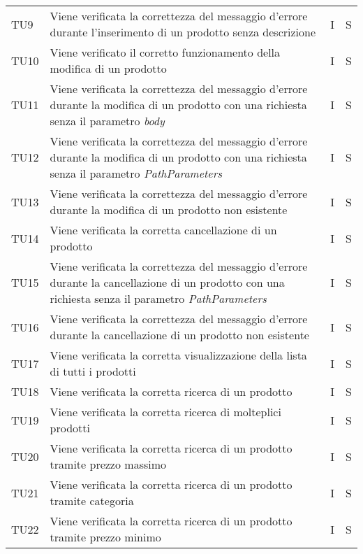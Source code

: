 {\begin{longtable}{C{2cm} C{9.6cm} C{1.5cm} C{1cm}}
TU9 & Viene verificata la correttezza del messaggio d'errore durante l'inserimento di un prodotto senza descrizione & I & S\\

TU10 & Viene verificato il corretto funzionamento della modifica di un prodotto & I & S\\

TU11 & Viene verificata la correttezza del messaggio d'errore durante la modifica di un prodotto con una richiesta senza il parametro \textit{body} & I & S\\


TU12 & Viene verificata la correttezza del messaggio d'errore durante la modifica di un prodotto con una richiesta senza il parametro \textit{PathParameters} & I & S\\

TU13 & Viene verificata la correttezza del messaggio d'errore durante la modifica di un prodotto non esistente & I & S\\

TU14 & Viene verificata la corretta cancellazione di un prodotto & I & S\\

TU15 & Viene verificata la correttezza del messaggio d'errore durante la cancellazione di un prodotto con una richiesta senza il parametro \textit{PathParameters} & I & S\\

TU16 & Viene verificata la correttezza del messaggio d'errore durante la cancellazione di un prodotto non esistente & I & S\\

TU17 & Viene verificata la corretta visualizzazione della lista di tutti i prodotti & I & S\\

TU18 & Viene verificata la corretta ricerca di un prodotto & I & S\\

TU19 & Viene verificata la corretta ricerca di molteplici prodotti & I & S\\

TU20 & Viene verificata la corretta ricerca di un prodotto tramite prezzo massimo & I & S\\

TU21 & Viene verificata la corretta ricerca di un prodotto tramite categoria & I & S\\

TU22 & Viene verificata la corretta ricerca di un prodotto tramite prezzo minimo & I & S\\


\end{longtable}}

